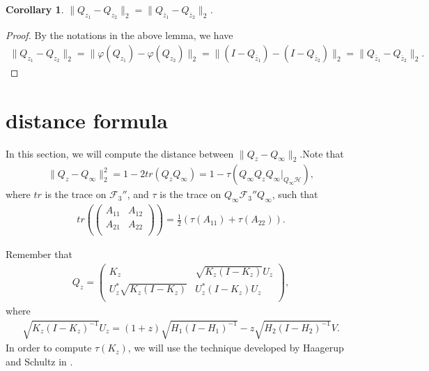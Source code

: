 \documentclass{amsart}
\newcommand{\F}{\mathcal F}
\newcommand{\HHH}{\mathcal H} %
\newtheorem{corollary}{Corollary}[section]
\begin{document}
\begin{corollary}
$\| Q_{z_1} - Q_{z_2} \|_{2} = \| Q_{\overline{z}_1} - Q_{\overline{z}_2} \|_{2}$.
\end{corollary}

\begin{proof}
By the notations in the above lemma, we have
\begin{align*}
\| Q_{z_1} - Q_{z_2} \|_{2} = \| \varphi(Q_{z_1}) - \varphi(Q_{z_2}) \|_{2} =  \|(I - Q_{\overline{z}_1}) - (I - Q_{\overline{z}_2}) \|_{2}
=  \| Q_{\overline{z}_1} - Q_{\overline{z}_2} \|_{2}.
\end{align*}
\end{proof}

\section{distance formula}

In this section, we will compute the distance between $\parallel Q_{z} - Q_{\infty} \parallel_{2}$.Note that
\begin{align*}
\parallel Q_{z} - Q_{\infty} \parallel_{2}^{2} = 1-2tr(Q_{z}Q_{\infty}) = 1 - \tau(Q_{\infty}Q_{z}Q_{\infty}|_{Q_{\infty}\HHH}),
\end{align*}
where $tr$ is the trace on $\F_{3}''$, and $\tau$ is the trace on $Q_{\infty}\F_{3}''Q_{\infty}$, such that
\begin{align*}
tr(\left(
     \begin{array}{cc}
       A_{11} & A_{12} \\
       A_{21} & A_{22} \\
     \end{array}
   \right)) = \frac{1}{2}(\tau(A_{11}) + \tau(A_{22})).
\end{align*}

Remember that
\begin{align*}
Q_{z} = \left(
     \begin{array}{cc}
      K_{z} & \sqrt{K_{z}(I-K_{z})}U_{z} \\
      U_{z}^{*}\sqrt{K_{z}(I-K_{z})} & U_{z}^{*}(I-K_{z})U_{z} \\
  \end{array}
\right) ,
\end{align*}
where
\begin{align*}
\sqrt{K_{z}(I-K_{z})^{-1}}U_{z} = (1+z)\sqrt{H_{1}(I-H_{1})^{-1}}-
                                   z\sqrt{H_{2}(I-H_{2})^{-1}}V.
\end{align*}
In order to compute $\tau(K_{z})$, we will use the technique developed by Haagerup and Schultz in \cite{HH}.
\end{document}
